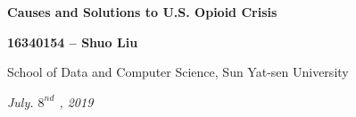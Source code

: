 \documentclass[a4paper]{article}
\begin{document}
\begin{center}
\LARGE\textbf{Causes and Solutions to U.S. Opioid Crisis}
\end{center}
\vspace{2cm}

\vspace{2mm}
\begin{center}
\large\textbf{16340154 -- Shuo Liu}\\
\end{center}

\begin{center}
\small{School of Data and Computer Science, Sun Yat-sen University}
\end{center}

\begin{center}
\textit{July. $8^{nd}$ \textit, 2019\\}
\end{center}
\vspace{1cm}
\end{document}

